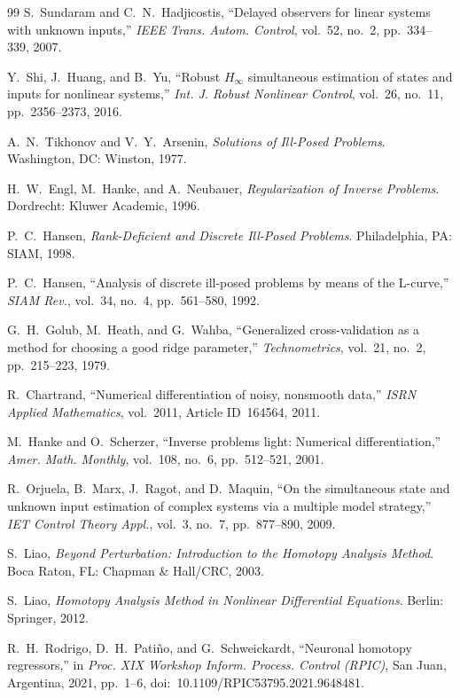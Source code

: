 \documentclass[lettersize,journal]{IEEEtran}
\begin{document}
\begin{thebibliography}{99}
S.~Sundaram and C.~N.~Hadjicostis, ``Delayed observers for linear systems with unknown inputs,'' \textit{IEEE Trans. Autom. Control}, vol.~52, no.~2, pp.~334--339, 2007.

Y.~Shi, J.~Huang, and B.~Yu, ``Robust $H_\infty$ simultaneous estimation of states and inputs for nonlinear systems,'' \textit{Int. J. Robust Nonlinear Control}, vol.~26, no.~11, pp.~2356--2373, 2016.

A.~N.~Tikhonov and V.~Y.~Arsenin, \textit{Solutions of Ill-Posed Problems}. Washington, DC: Winston, 1977.

H.~W.~Engl, M.~Hanke, and A.~Neubauer, \textit{Regularization of Inverse Problems}. Dordrecht: Kluwer Academic, 1996.

P.~C.~Hansen, \textit{Rank-Deficient and Discrete Ill-Posed Problems}. Philadelphia, PA: SIAM, 1998.

P.~C.~Hansen, ``Analysis of discrete ill-posed problems by means of the L-curve,'' \textit{SIAM Rev.}, vol.~34, no.~4, pp.~561--580, 1992.

G.~H.~Golub, M.~Heath, and G.~Wahba, ``Generalized cross-validation as a method for choosing a good ridge parameter,'' \textit{Technometrics}, vol.~21, no.~2, pp.~215--223, 1979.

R.~Chartrand, ``Numerical differentiation of noisy, nonsmooth data,'' \textit{ISRN Applied Mathematics}, vol.~2011, Article ID~164564, 2011.

M.~Hanke and O.~Scherzer, ``Inverse problems light: Numerical differentiation,'' \textit{Amer. Math. Monthly}, vol.~108, no.~6, pp.~512--521, 2001.

R.~Orjuela, B.~Marx, J.~Ragot, and D.~Maquin, ``On the simultaneous state and unknown input estimation of complex systems via a multiple model strategy,'' \textit{IET Control Theory Appl.}, vol.~3, no.~7, pp.~877--890, 2009.

S.~Liao, \textit{Beyond Perturbation: Introduction to the Homotopy Analysis Method}. Boca Raton, FL: Chapman \& Hall/CRC, 2003.

S.~Liao, \textit{Homotopy Analysis Method in Nonlinear Differential Equations}. Berlin: Springer, 2012.

R.~H.~Rodrigo, D.~H.~Pati\~no, and G.~Schweickardt, ``Neuronal homotopy regressors,'' in \textit{Proc. XIX Workshop Inform. Process. Control (RPIC)}, San Juan, Argentina, 2021, pp.~1--6, doi:~10.1109/RPIC53795.2021.9648481.


\end{thebibliography}
\end{document}

